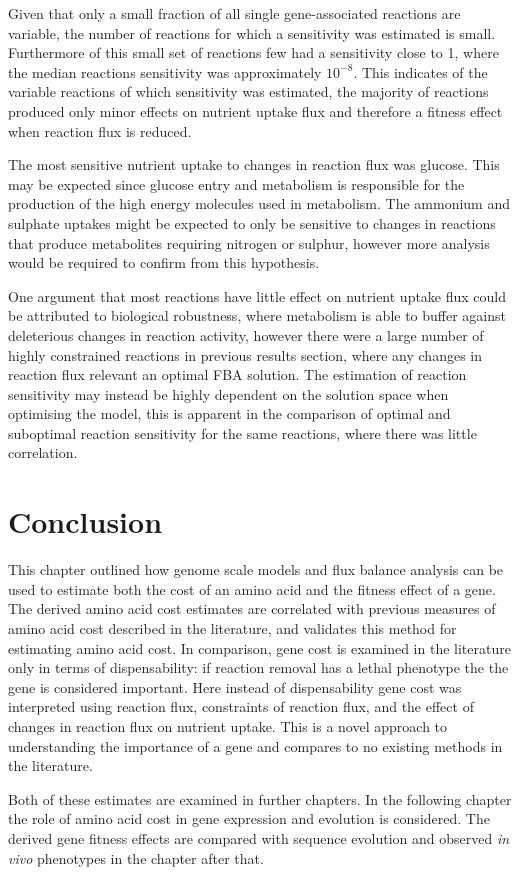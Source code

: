 Given that only a small fraction of all single gene-associated reactions are variable, the number of reactions for which a sensitivity was estimated is small. Furthermore of this small set of reactions few had a sensitivity close to 1, where the median reactions sensitivity was approximately $10^{-8}$. This indicates of the variable reactions of which sensitivity was estimated, the majority of reactions produced only minor effects on nutrient uptake flux and therefore a fitness effect when reaction flux is reduced.

The most sensitive nutrient uptake to changes in reaction flux was glucose. This may be expected since glucose entry and metabolism is responsible for the production of the high energy molecules used in metabolism. The ammonium and sulphate uptakes might be expected to only be sensitive to changes in reactions that produce metabolites requiring nitrogen or sulphur, however more analysis would be required to confirm from this hypothesis.

One argument that most reactions have little effect on nutrient uptake flux could be attributed to biological robustness, where metabolism is able to buffer against deleterious changes in reaction activity, however there were a large number of highly constrained reactions in previous results section, where any changes in reaction flux relevant an optimal FBA solution. The estimation of reaction sensitivity may instead be highly dependent on the solution space when optimising the model, this is apparent in the comparison of optimal and suboptimal reaction sensitivity for the same reactions, where there was little correlation.

\clearpage

\section{Conclusion}%

This chapter outlined how genome scale models and flux balance analysis can be used to estimate both the cost of an amino acid and the fitness effect of a gene. The derived amino acid cost estimates are correlated with previous measures of amino acid cost described in the literature, and validates this method for estimating amino acid cost. In comparison, gene cost is examined in the literature only in terms of dispensability: if reaction removal has a lethal phenotype the the gene is considered important. Here instead of dispensability gene cost was interpreted using reaction flux, constraints of reaction flux, and the effect of changes in reaction flux on nutrient uptake. This is a novel approach to understanding the importance of a gene and compares to no existing methods in the literature.

Both of these estimates are examined in further chapters. In the following chapter the role of amino acid cost in gene expression and evolution is considered. The derived gene fitness effects are compared with sequence evolution and observed \emph{in vivo} phenotypes in the chapter after that.

